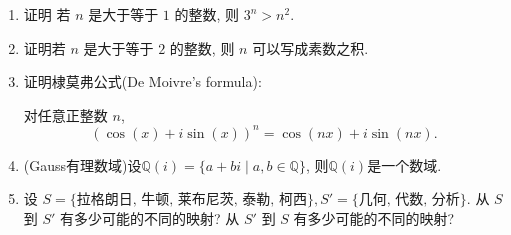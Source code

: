 \documentclass{ctexart}
\newcommand{\Q}{\mathbb{Q}}
\begin{document}
\begin{enumerate}
  \item 证明 若 $n$ 是大于等于 $1$ 的整数, 则 $3^n > n^2$.
  \item 证明若 $n$ 是大于等于 $2$ 的整数, 则 $n$ 可以写成素数之积.
  \item 证明棣莫弗公式(De Moivre's formula):

  对任意正整数 $n$,
  \[
  (\cos(x) + i\sin(x))^n = \cos(nx) + i\sin(nx).
  \]
  \item (Gauss有理数域)设$\Q(i) = \{a +bi \mid a,b\in \Q\}$, 则$\Q(i)$是一个数域.
  \item 设 $S = \{\text{拉格朗日, 牛顿, 莱布尼茨, 泰勒, 柯西}\}, S' = \{\text{几何, 代数, 分析}\}$. 从 $S$ 到 $S'$ 有多少可能的不同的映射? 从 $S'$ 到 $S$ 有多少可能的不同的映射?

\end{enumerate}
\end{document}
